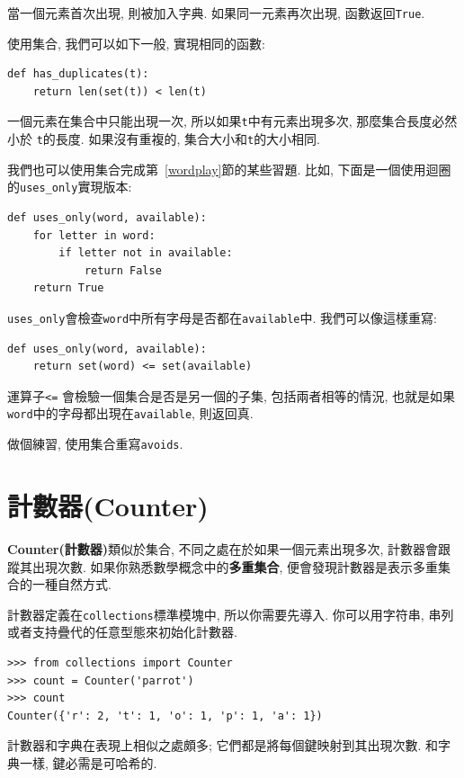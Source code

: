 \documentclass[10pt]{book}
\begin{document}
當一個元素首次出現, 則被加入字典. 
如果同一元素再次出現, 函數返回{\tt True}. 

使用集合, 我們可以如下一般, 實現相同的函數:

\begin{verbatim}
def has_duplicates(t):
    return len(set(t)) < len(t)
\end{verbatim}
%
一個元素在集合中只能出現一次, 所以如果{\tt t}中有元素出現多次, 那麼集合長度必然小於
{\tt t}的長度. 
如果沒有重複的, 集合大小和{\tt t}的大小相同. 

我們也可以使用集合完成第~\ref{wordplay}節的某些習題. 
比如, 下面是一個使用迴圈的\verb"uses_only"實現版本:

\begin{verbatim}
def uses_only(word, available):
    for letter in word: 
        if letter not in available:
            return False
    return True
\end{verbatim}
%
\verb"uses_only"會檢查{\tt word}中所有字母是否都在{\tt available}中.
我們可以像這樣重寫:

\begin{verbatim}
def uses_only(word, available):
    return set(word) <= set(available)
\end{verbatim}
%

運算子\verb"<=" 會檢驗一個集合是否是另一個的子集, 包括兩者相等的情況, 
也就是如果{\tt word}中的字母都出現在{\tt available}, 則返回真. 

做個練習, 使用集合重寫\verb"avoids". 


\section{計數器(Counter)}

{\bf Counter(計數器)}類似於集合, 不同之處在於如果一個元素出現多次, 計數器會跟蹤其出現次數. 
如果你熟悉數學概念中的{\bf 多重集合}, 便會發現計數器是表示多重集合的一種自然方式. 

計數器定義在{\tt collections}標準模塊中, 
所以你需要先導入. 
你可以用字符串, 串列或者支持疊代的任意型態來初始化計數器. 

\begin{verbatim}
>>> from collections import Counter
>>> count = Counter('parrot')
>>> count
Counter({'r': 2, 't': 1, 'o': 1, 'p': 1, 'a': 1})
\end{verbatim}

計數器和字典在表現上相似之處頗多;
它們都是將每個鍵映射到其出現次數. 
和字典一樣, 鍵必需是可哈希的. 
\end{document}
